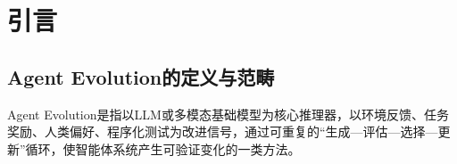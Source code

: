 \section{引言}
\label{ch:intro}

\subsection{Agent Evolution的定义与范畴}

Agent Evolution是指以LLM或多模态基础模型为核心推理器，以环境反馈、任务奖励、人类偏好、程序化测试为改进信号，通过可重复的``生成—评估—选择—更新''循环，使智能体系统产生可验证变化的一类方法。

